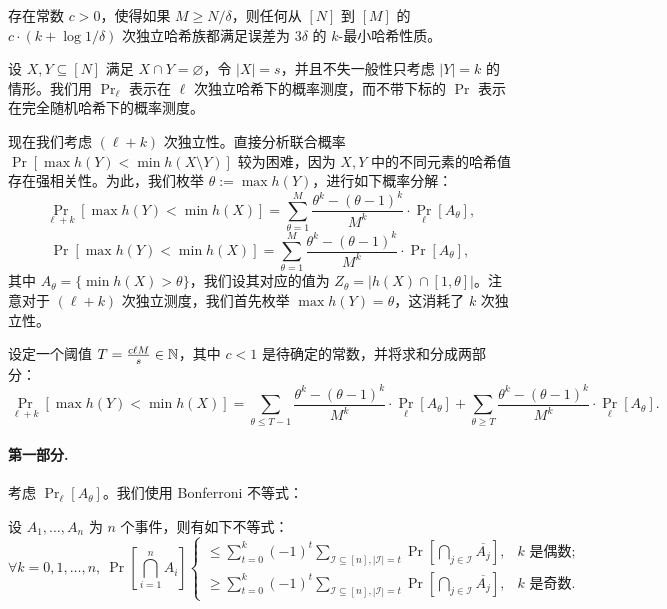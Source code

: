 \begin{theorem}\label{thm:k_log_1_eps_upper_bound}
    存在常数 $c > 0$，使得如果 $M \ge N / \delta$，则任何从 $[N]$ 到 $[M]$ 的 $c \cdot (k + \log 1 / \delta)$ 次独立哈希族都满足误差为 $3 \delta$ 的 $k$-最小哈希性质。
\end{theorem}

设 $X, Y \subseteq [N]$ 满足 $X \cap Y = \varnothing$，令 $|X| = s$，并且不失一般性只考虑 $|Y| = k$ 的情形。我们用 $\Pr_\ell$ 表示在 $\ell$ 次独立哈希下的概率测度，而不带下标的 $\Pr$ 表示在完全随机哈希下的概率测度。

现在我们考虑 $(\ell + k)$ 次独立性。直接分析联合概率 $\Pr[\max h(Y) < \min h(X \setminus Y)]$ 较为困难，因为 $X, Y$ 中的不同元素的哈希值存在强相关性。为此，我们枚举 $\theta := \max h(Y)$，进行如下概率分解：
$$
\Pr_{\ell + k}[\max h(Y) < \min h(X)] = \sum_{\theta = 1}^M \frac{\theta^k - (\theta - 1)^k}{M^k} \cdot \Pr_\ell[A_\theta],
$$
$$
\Pr[\max h(Y) < \min h(X)] = \sum_{\theta = 1}^M \frac{\theta^k - (\theta - 1)^k}{M^k} \cdot \Pr[A_\theta],
$$
其中 $A_\theta = \{\min h(X) > \theta\}$，我们设其对应的值为 $Z_\theta = \big| h(X) \cap [1, \theta] \big|$。注意对于 $(\ell + k)$ 次独立测度，我们首先枚举 $\max h(Y) = \theta$，这消耗了 $k$ 次独立性。

设定一个阈值 $T = \frac{c \ell M}{s} \in \mathbb{N}$，其中 $c < 1$ 是待确定的常数，并将求和分成两部分：
$$
\Pr_{\ell + k}[\max h(Y) < \min h(X)] = \sum_{\theta \le T - 1} \frac{\theta^k - (\theta - 1)^k}{M^k} \cdot \Pr_\ell[A_\theta] + \sum_{\theta \ge T} \frac{\theta^k - (\theta - 1)^k}{M^k} \cdot \Pr_\ell[A_\theta].
$$

\paragraph{第一部分.}

考虑 $\Pr_\ell[A_\theta]$。我们使用 Bonferroni 不等式：

\begin{lemma}
    设 $A_1, \ldots, A_n$ 为 $n$ 个事件，则有如下不等式：
    $$
    \forall k = 0, 1, \ldots, n,\ \Pr\left[ \bigcap_{i = 1}^n A_i \right]
    \begin{cases}
        \le \sum_{t = 0}^k (-1)^t \sum_{\mathcal{I} \subseteq [n], |\mathcal{I}| = t} \Pr\left[ \bigcap_{j \in \mathcal{I}} \overline{A_j} \right], & k\text{ 是偶数}; \\
        \ge \sum_{t = 0}^k (-1)^t \sum_{\mathcal{I} \subseteq [n], |\mathcal{I}| = t} \Pr\left[ \bigcap_{j \in \mathcal{I}} \overline{A_j} \right], & k\text{ 是奇数}.
    \end{cases}
    $$
\end{lemma}

